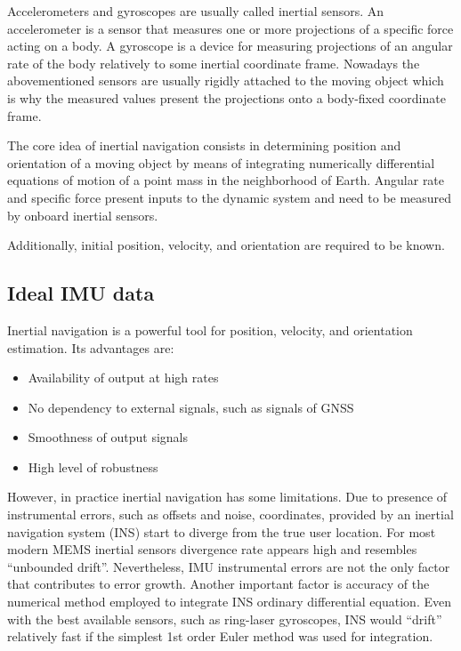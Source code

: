 \documentclass[conference]{IEEEtran}
\begin{document}
Accelerometers and gyroscopes are usually called inertial sensors. An accelerometer is a sensor that measures one or more projections of a specific force acting on a body. A gyroscope is a device for measuring projections of an angular rate of the body relatively to some inertial coordinate frame. Nowadays the abovementioned sensors are usually rigidly attached to the moving object which is why the measured values present the projections onto a body-fixed coordinate frame.

The core idea of inertial navigation consists in determining position and orientation of a moving object by means of integrating numerically differential equations of motion of a point mass in the neighborhood of Earth. Angular rate and specific force present inputs to the dynamic system and need to be measured by onboard inertial sensors. 

Additionally, initial position, velocity, and orientation are required to be known.

\subsection{Ideal IMU data}

Inertial navigation is a powerful tool for position, velocity, and orientation estimation. Its advantages are:

\begin{itemize}
  \item Availability of output at high rates
  \item No dependency to external signals, such as signals of GNSS
  \item Smoothness of output signals
  \item High level of robustness
\end{itemize}

However, in practice inertial navigation has some limitations. Due to presence of instrumental errors, such as offsets and noise, coordinates, provided by an inertial navigation system (INS) start to diverge from the true user location. For most modern MEMS inertial sensors divergence rate appears high and resembles “unbounded drift”. Nevertheless, IMU instrumental errors are not the only factor that contributes to error growth. Another important factor is accuracy of the numerical method employed to integrate INS ordinary differential equation. Even with the best available sensors, such as ring-laser gyroscopes, INS would “drift” relatively fast if the simplest 1st order Euler method was used for integration.
\end{document}
